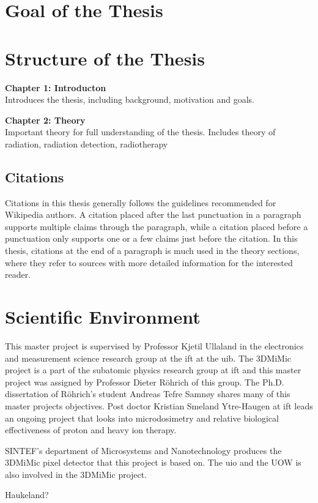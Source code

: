 \documentclass[../main/thesis.tex]{subfiles}
\begin{document}
\section{Goal of the Thesis}
\label{i-goal}




\section{Structure of the Thesis}
\label{i-structure}
\textbf{Chapter 1: Introducton}\\
Introduces the thesis, including background, motivation and goals.

\textbf{Chapter 2: Theory}\\
Important theory for full understanding of the thesis. Includes theory of radiation, radiation detection, radiotherapy

\subsection{Citations}
Citations in this thesis generally follows the guidelines recommended for Wikipedia authors. A citation placed after the last punctuation in a paragraph supports multiple claims through the paragraph, while a citation placed before a punctuation only supports one or a few claims just before the citation. In this thesis, citations at the end of a paragraph is much used in the theory sections, where they refer to sources with more detailed information for the interested reader.

\section{Scientific Environment}
\label{i-environment}
This master project is supervised by Professor Kjetil Ullaland in the electronics and measurement science research group at the \gls{ift} at the \gls{uib}. The 3DMiMic project is a part of the subatomic physics research group at \gls{ift} and this master project was assigned by Professor Dieter Röhrich of this group. The Ph.D. dissertation of Röhrich's student Andreas Tefre Samnøy shares many of this master projects objectives. Post doctor Kristian Smeland Ytre-Haugen at \gls{ift} leads an ongoing project that looks into microdosimetry and relative biological effectiveness of proton and heavy ion therapy. 

SINTEF's department of Microsystems and Nanotechnology produces the 3DMiMic pixel detector that this project is based on. The \gls{uio} and the \gls{UOW} is also involved in the 3DMiMic project. 

Haukeland?
\end{document}
